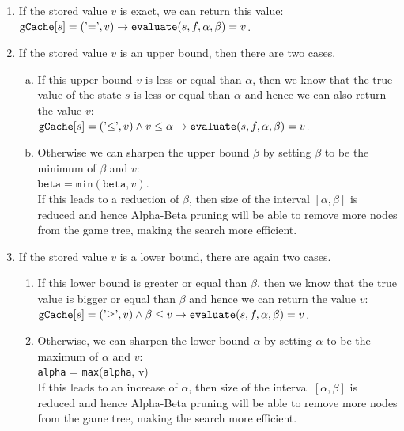 \begin{enumerate}
\item If the stored value $v$ is exact, we can return this value:
      \\[0.2cm]
      \hspace*{1.3cm}
      $\texttt{gCache}[s] = (\mbox{'$=$'}, v) \rightarrow \texttt{evaluate}(s, f, \alpha, \beta) = v$.
\item If the stored value $v$ is an upper bound, then there are two cases.
      \begin{enumerate}[(a)]
      \item If this upper bound $v$ is less or equal than $\alpha$, then we know that
            the true value of the state $s$ is less or equal than $\alpha$ and hence we can also return the value $v$:
            \\[0.2cm]
            \hspace*{1.3cm}
            $\texttt{gCache}[s] = (\mbox{'$\leq$'}, v) \wedge v \leq \alpha \rightarrow 
     \texttt{evaluate}(s, f, \alpha, \beta) = v$.
      \item Otherwise we can sharpen the upper bound $\beta$ by setting $\beta$ to be the minimum of $\beta$
            and $v$:
            \\[0.2cm]
            \hspace*{1.3cm}
            $\texttt{beta} = \texttt{min}(\texttt{beta}, v)$.
            \\[0.2cm]
            If this leads to a reduction of $\beta$, then size of the interval $[\alpha, \beta]$ is reduced
            and hence Alpha-Beta pruning will be able to remove more nodes from the game tree, making the
            search more efficient.
      \end{enumerate}
      \item If the stored value $v$ is a lower bound, there are again two cases.
      \begin{enumerate}
      \item If this lower bound is greater or equal than $\beta$, then we 
            know that the true value is bigger or equal than $\beta$ and hence we can return the value $v$: 
            \\[0.2cm]
            \hspace*{1.3cm}
            $\texttt{gCache}[s] = (\mbox{'$\geq$'}, v) \wedge \beta \leq v \rightarrow 
     \texttt{evaluate}(s, f, \alpha, \beta) = v$.
      \item Otherwise, we can sharpen the lower bound $\alpha$ by setting $\alpha$ to be the maximum of
            $\alpha$ and $v$:
            \\[0.2cm]
            \hspace*{1.3cm}
            \texttt{alpha} = \texttt{max}(\texttt{alpha}, v)
            \\[0.2cm]
            If this leads to an increase of $\alpha$, then size of the interval $[\alpha, \beta]$ is reduced
            and hence Alpha-Beta pruning will be able to remove more nodes from the game tree, making the
            search more efficient.
      \end{enumerate}
\end{enumerate}
